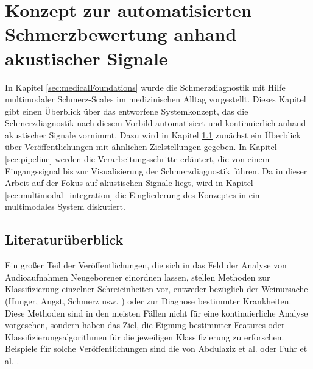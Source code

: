 \chapter{Konzept zur automatisierten Schmerzbewertung anhand akustischer Signale}
\label{sec:concept}

In Kapitel \ref{sec:medicalFoundations} wurde die Schmerzdiagnostik mit Hilfe multimodaler Schmerz-Scales im medizinischen Alltag vorgestellt. Dieses Kapitel gibt einen Überblick über das entworfene Systemkonzept, das die Schmerzdiagnostik nach diesem Vorbild automatisiert und kontinuierlich anhand akustischer Signale vornimmt. Dazu wird in Kapitel \ref{sec:system_literature} zunächst ein Überblick über Veröffentlichungen mit ähnlichen Zielstellungen gegeben. In Kapitel \ref{sec:pipeline} werden die Verarbeitungsschritte erläutert, die von einem Eingangssignal bis zur Visualisierung der Schmerzdiagnostik führen. Da in dieser Arbeit auf der Fokus auf akustischen Signale liegt, wird in Kapitel \ref{sec:multimodal_integration} die Eingliederung des Konzeptes in ein multimodales System diskutiert.

\section{Literaturüberblick}
\label{sec:system_literature}

Ein großer Teil der Veröffentlichungen, die sich in das Feld der Analyse von Audioaufnahmen Neugeborener einordnen lassen, stellen Methoden zur Klassifizierung einzelner Schreieinheiten vor, entweder bezüglich der Weinursache (Hunger, Angst, Schmerz usw. ) oder zur Diagnose bestimmter Krankheiten. Diese Methoden sind in den meisten Fällen nicht für eine kontinuierliche Analyse vorgesehen, sondern haben das Ziel, die Eignung bestimmter Features oder Klassifizierungsalgorithmen für die jeweiligen Klassifizierung zu erforschen. Beispiele für solche Veröffentlichungen sind die von Abdulaziz et al. \cite{class_abdulaziz} oder Fuhr et al. \cite{comparisonOfLearning}.


